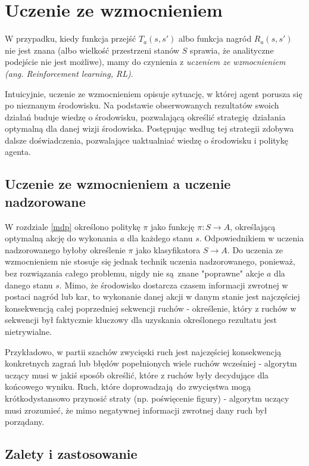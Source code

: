 \section{Uczenie ze wzmocnieniem}

W przypadku, kiedy funkcja przejść $T_a(s,s')$ albo funkcja nagród $R_a(s,s')$ nie jest znana (albo wielkość przestrzeni stanów $S$ sprawia, że analityczne podejście nie jest możliwe), mamy do czynienia z \textit{uczeniem ze wzmocnieniem (ang. Reinforcement learning, RL)}.

Intuicyjnie, uczenie ze wzmocnieniem opisuje sytuację, w której agent porusza się po nieznanym środowisku. Na podstawie obserwowanych rezultatów swoich działań buduje wiedzę o środowisku, pozwalającą określić strategię działania optymalną dla danej wizji środowiska. Postępując według tej strategii zdobywa dalsze doświadczenia, pozwalające uaktualniać wiedzę o środowisku i politykę agenta.

\subsection{Uczenie ze wzmocnieniem a uczenie nadzorowane}
W rozdziale \ref{mdp} określono politykę $\pi$ jako funkcję $\pi: S \rightarrow A$, określającą optymalną akcję do wykonania $a$ dla każdego stanu $s$. Odpowiednikiem w uczenia nadzorowanego byłoby określenie $\pi$ jako klasyfikatora $S \rightarrow A$. Do uczenia ze wzmocnieniem nie stosuje się jednak technik uczenia nadzorowanego, ponieważ, bez rozwiązania całego problemu, nigdy nie są znane "poprawne" akcje $a$ dla danego stanu $s$. Mimo, że środowisko dostarcza czasem informacji zwrotnej w postaci nagród lub kar, to wykonanie danej akcji w danym stanie jest najczęściej konsekwencją całej poprzedniej sekwencji ruchów - określenie, który z ruchów w sekwencji był faktycznie kluczowy dla uzyskania określonego rezultatu jest nietrywialne.

Przykładowo, w partii szachów zwycięski ruch jest najczęściej konsekwencją konkretnych zagrań lub błędów popełnionych wiele ruchów wcześniej - algorytm uczący musi w jakiś sposób określić, które z ruchów były decydujące dla końcowego wyniku. Ruch, które doprowadzają do zwycięstwa mogą krótkodystansowo przynosić straty (np. poświęcenie figury) - algorytm uczący musi zrozumieć, że mimo negatywnej informacji zwrotnej dany ruch był porządany.

\subsection{Zalety i zastosowanie}


